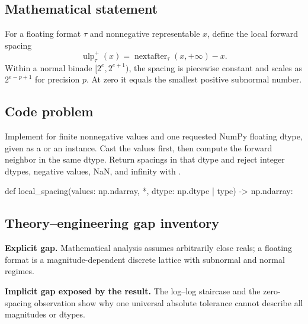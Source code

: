 
        \subsection{Mathematical statement}


For a floating format $\tau$ and nonnegative representable $x$, define the local
forward spacing
\[
  \operatorname{ulp}_{\tau}^{+}(x)
  =\operatorname{nextafter}_{\tau}(x,+\infty)-x.
\]
Within a normal binade $[2^e,2^{e+1})$, the spacing is piecewise constant and
scales as $2^{e-p+1}$ for precision $p$.  At zero it equals the smallest positive
subnormal number.


        \subsection{Code problem}


Implement  for finite nonnegative values and one requested
NumPy floating dtype, given as a  or an  instance.
Cast the values first, then compute the forward neighbor
in the same dtype.  Return spacings in that dtype and reject integer dtypes,
negative values, NaN, and infinity with .


        \begin{contractbox}
        \begin{Code}
        def local_spacing(values: np.ndarray, *, dtype: np.dtype | type) -> np.ndarray:
        \end{Code}
        \end{contractbox}

        \subsection{Theory--engineering gap inventory}

        \begin{gapbox}
        \textbf{Explicit gap.} Mathematical analysis assumes arbitrarily close reals; a floating format is a magnitude-dependent discrete lattice with subnormal and normal regimes.

        \textbf{Implicit gap exposed by the result.} The log--log staircase and the zero-spacing observation show why one universal absolute tolerance cannot describe all magnitudes or dtypes.
        \end{gapbox}

